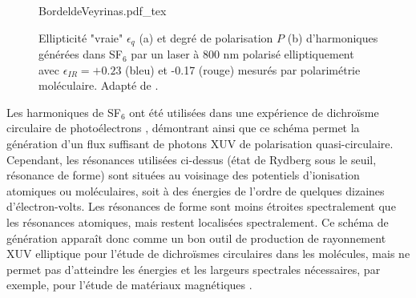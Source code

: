 \begin{figure}
\centering
\def\svgwidth{\textwidth}
{BordeldeVeyrinas.pdf_tex}
\caption{Ellipticité "vraie" $\epsilon_q$ (a) et degré de polarisation $P$ (b) d'harmoniques générées dans SF$_6$ par un laser à 800 nm polarisé elliptiquement avec $\epsilon_{IR} = +0.23$ (bleu) et -0.17 (rouge) mesurés par polarimétrie moléculaire. Adapté de .}
\label{fig:ResultatsFaradSF6}
\end{figure}

Les harmoniques de SF$_6$ ont été utilisées dans une expérience de dichroïsme circulaire de photoélectrons , démontrant ainsi que ce schéma permet la génération d'un flux suffisant de photons XUV de polarisation quasi-circulaire. Cependant, les résonances utilisées ci-dessus (état de Rydberg sous le seuil, résonance de forme) sont situées au voisinage des potentiels d'ionisation atomiques ou moléculaires, soit à des énergies de l'ordre de quelques dizaines d'électron-volts. Les résonances de forme sont moins étroites spectralement que les résonances atomiques, mais restent localisées spectralement. Ce schéma de génération apparaît donc comme un bon outil de production de rayonnement XUV elliptique pour l'étude de dichroïsmes circulaires dans les molécules, mais ne permet pas d'atteindre les énergies et les largeurs spectrales nécessaires, par exemple, pour  l'étude de matériaux magnétiques .

